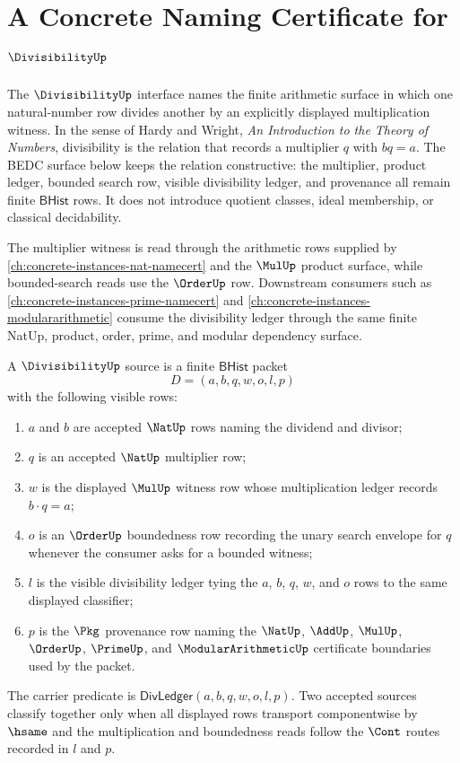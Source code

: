 \chapter{A Concrete Naming Certificate for $\DivisibilityUp$}
\label{ch:concrete-instances-divisibility-namecert}

The $\DivisibilityUp$ interface names the finite arithmetic surface in which
one natural-number row divides another by an explicitly displayed
multiplication witness. In the sense of Hardy and Wright,
\emph{An Introduction to the Theory of Numbers}, divisibility is the relation
that records a multiplier $q$ with $bq=a$. The BEDC surface below keeps the
relation constructive: the multiplier, product ledger, bounded search row,
visible divisibility ledger, and provenance all remain finite
$\mathsf{BHist}$ rows. It does not introduce quotient classes, ideal
membership, or classical decidability.

The multiplier witness is read through the arithmetic rows supplied by
\autoref{ch:concrete-instances-nat-namecert} and the $\MulUp$ product
surface, while bounded-search reads use the $\OrderUp$ row. Downstream
consumers such as \autoref{ch:concrete-instances-prime-namecert} and
\autoref{ch:concrete-instances-modulararithmetic} consume the divisibility
ledger through the same finite NatUp, product, order, prime, and modular
dependency surface.

\begin{definition}
\label{def:divisibility-bhist-carrier}
A $\DivisibilityUp$ source is a finite $\mathsf{BHist}$ packet
$$
D=(a,b,q,w,o,l,p)
$$
with the following visible rows:
\begin{enumerate}
\item $a$ and $b$ are accepted $\NatUp$ rows naming the dividend and divisor;
\item $q$ is an accepted $\NatUp$ multiplier row;
\item $w$ is the displayed $\MulUp$ witness row whose multiplication ledger
records $b\cdot q=a$;
\item $o$ is an $\OrderUp$ boundedness row recording the unary search envelope
for $q$ whenever the consumer asks for a bounded witness;
\item $l$ is the visible divisibility ledger tying the $a$, $b$, $q$, $w$, and
$o$ rows to the same displayed classifier;
\item $p$ is the $\Pkg$ provenance row naming the $\NatUp$, $\AddUp$,
$\MulUp$, $\OrderUp$, $\PrimeUp$, and $\ModularArithmeticUp$ certificate
boundaries used by the packet.
\end{enumerate}
The carrier predicate is
$\mathsf{DivLedger}(a,b,q,w,o,l,p)$. Two accepted sources classify together
only when all displayed rows transport componentwise by $\hsame$ and the
multiplication and boundedness reads follow the $\Cont$ routes recorded in
$l$ and $p$.
\end{definition}

